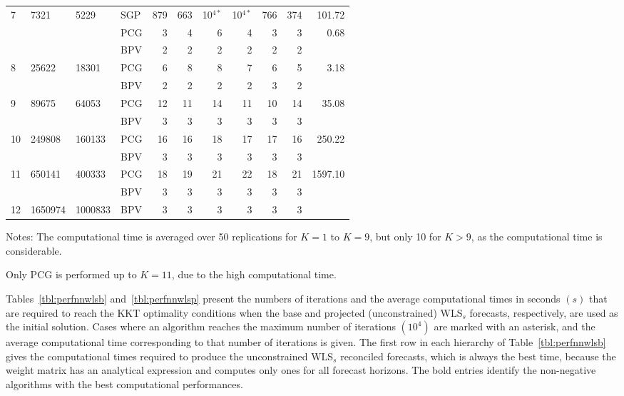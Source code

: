 \documentclass[twocolumn]{svjour3}
\begin{document}
\begin{table*}[ht]
\begin{threeparttable}
\begin{tabular}{llllrrrrrrr}
			\midrule
			7 & 7321 & 5229 & SGP & 879 & 663 & 10$^{4*}$ & 10$^{4*}$ & 766 & 374 & 101.72 \\
			& & & PCG & 3 & 4 & 6 & 4 & 3 & 3 & 0.68 \\
			& & & BPV & 2 & 2 & 2 & 2 & 2 & 2 & \bm{$0.57$} \\
			\midrule
			8 & 25622 & 18301 & PCG & 6 & 8 & 8 & 7 & 6 & 5 & 3.18 \\
			& & & BPV & 2 & 2 & 2 & 2 & 3 & 2 & \bm{$1.76$} \\
			\midrule
			9 & 89675 & 64053 & PCG & 12 & 11 & 14 & 11 & 10 & 14 & 35.08 \\
			& & & BPV & 3 & 3 & 3 & 3 & 3 & 3 & \bm{$6.45$} \\
			\midrule
			10 & 249808 & 160133 & PCG & 16 & 16 & 18 & 17 & 17 & 16 & 250.22 \\
			& & & BPV & 3 & 3 & 3 & 3 & 3 & 3 & \bm{$21.00$} \\
			\midrule
			11 & 650141 & 400333 & PCG & 18 & 19 & 21 & 22 & 18 & 21 & 1597.10 \\
			& & & BPV & 3 & 3 & 3 & 3 & 3 & 3 & \bm{$56.84$} \\
			\midrule
			12 & 1650974 & 1000833 & BPV & 3 & 3 & 3 & 3 & 3 & 3 & \bm{$3247.09$} \\
			\bottomrule
		\end{tabular}
		\begin{tablenotes}
			\item [] Notes: The computational time is averaged over 50 replications for $K = 1$ to $K = 9$, but only 10 for $K > 9$, as the computational time is considerable.
			\item [] Only PCG is performed up to $K = 11$, due to the high computational time.
		\end{tablenotes}
	\end{threeparttable}
\end{table*}


Tables~\ref{tbl:perfnnwlsb} and~\ref{tbl:perfnnwlsp} present the numbers of iterations and the average computational times in seconds $(s)$ that are required to reach the KKT optimality conditions when the base and projected (unconstrained) WLS$_{s}$ forecasts, respectively, are used as the initial solution. Cases where an algorithm reaches the maximum number of iterations $(10^{4})$ are marked with an asterisk, and the average computational time corresponding to that number of iterations is given. The first row in each hierarchy of Table~\ref{tbl:perfnnwlsb} gives the computational times required to produce the unconstrained WLS$_{s}$ reconciled forecasts, which is always the best time, because the weight matrix has an analytical expression and computes only ones for all forecast horizons. The bold entries identify the non-negative algorithms with the best computational performances.
\end{document}
